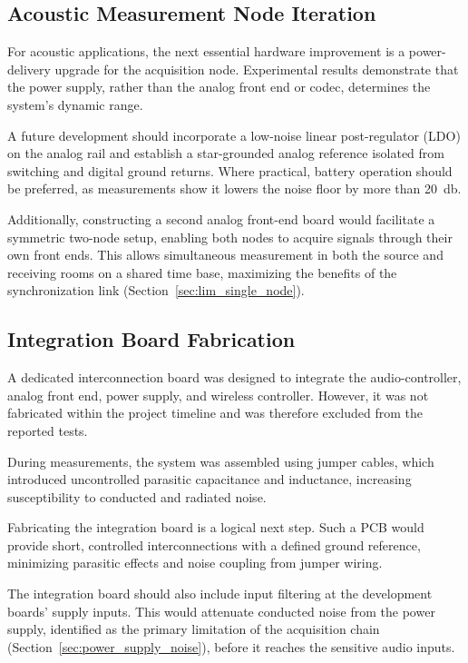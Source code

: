 \subsection{Acoustic Measurement Node Iteration}

For acoustic applications, the next essential hardware improvement is a power-delivery upgrade for the acquisition node. Experimental results demonstrate that the power supply, rather than the analog front end or codec, determines the system’s dynamic range.

A future development should incorporate a low-noise linear post-regulator (LDO) on the analog rail and establish a star-grounded analog reference isolated from switching and digital ground returns. Where practical, battery operation should be preferred, as measurements show it lowers the noise floor by more than \SI{20}{\decibel}.

Additionally, constructing a second analog front-end board would facilitate a symmetric two-node setup, enabling both nodes to acquire signals through their own front ends. This allows simultaneous measurement in both the source and receiving rooms on a shared time base, maximizing the benefits of the synchronization link (Section~\ref{sec:lim_single_node}).


\subsection{Integration Board Fabrication}

A dedicated interconnection board was designed to integrate the audio-controller, analog front end, power supply, and wireless controller. However, it was not fabricated within the project timeline and was therefore excluded from the reported tests.

During measurements, the system was assembled using jumper cables, which introduced uncontrolled parasitic capacitance and inductance, increasing susceptibility to conducted and radiated noise.

Fabricating the integration board is a logical next step. Such a PCB would provide short, controlled interconnections with a defined ground reference, minimizing parasitic effects and noise coupling from jumper wiring.

The integration board should also include input filtering at the development boards' supply inputs. This would attenuate conducted noise from the power supply, identified as the primary limitation of the acquisition chain (Section~\ref{sec:power_supply_noise}), before it reaches the sensitive audio inputs.

